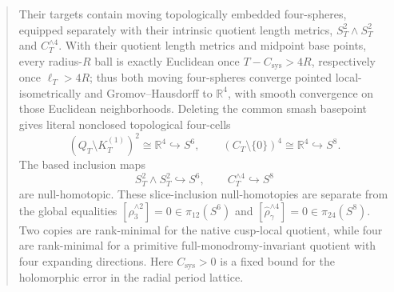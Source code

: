 \documentclass[11pt,letterpaper]{article}
\theoremstyle{definition}
\theoremstyle{remark}
\begin{document}
\begin{abstract}
 Their targets contain
 moving topologically embedded four-spheres, equipped separately with their
 intrinsic quotient length metrics,
 \(S_T^2\wedge S_T^2\) and \(C_T^{\wedge4}\).  With their quotient length
 metrics and midpoint base points, every radius-\(R\) ball is exactly
 Euclidean once \(T-C_{\mathrm{sys}}>4R\), respectively once
 \(\ell_T>4R\); thus both moving four-spheres converge pointed
 local-isometrically and Gromov--Hausdorff to \(\mathbb R^4\), with smooth
 convergence on those Euclidean neighborhoods.  Deleting the common smash
 basepoint gives literal nonclosed topological four-cells
 \[
  (Q_T\setminus K_T^{(1)})^2\cong\mathbb R^4\hookrightarrow S^6,
  \qquad
  (C_T\setminus\{0\})^4\cong\mathbb R^4\hookrightarrow S^8.
 \]
 The based inclusion maps
 \[
  S_T^2\wedge S_T^2\hookrightarrow S^6,
  \qquad
  C_T^{\wedge4}\hookrightarrow S^8
 \]
 are null-homotopic.  These slice-inclusion null-homotopies are separate from
 the global equalities
 \([\widehat\rho_3^{\wedge2}]=0\in\pi_{12}(S^6)\) and
 \([\widehat\rho_\gamma^{\wedge4}]=0\in\pi_{24}(S^8)\).  Two copies are
 rank-minimal for the
 native cusp-local quotient, while four are rank-minimal for a primitive
 full-monodromy-invariant quotient with four expanding directions.  Here
 \(C_{\mathrm{sys}}>0\) is a fixed bound for the holomorphic error in the
 radial period lattice.


\end{abstract}
\end{document}
